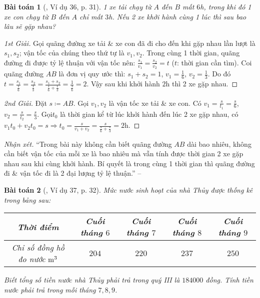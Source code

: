 \documentclass{article}
\newtheorem{baitoan}{Bài toán}
\begin{document}
\begin{baitoan}[\cite{Tuyen_Toan_7}, Ví dụ 36, p. 31]
	1 xe tải chạy từ $A$ đến $B$ mất $6$\emph{h}, trong khi đó 1 xe con chạy từ $B$ đến $A$ chỉ mất $3$\emph{h}. Nếu 2 xe khởi hành cùng 1 lúc thì sau bao lâu sẽ gặp nhau?
\end{baitoan}

\begin{proof}[1st Giải]
	Gọi quãng đường xe tải \& xe con đã đi cho đến khi gặp nhau lần lượt là $s_1,s_2$; vận tốc của chúng theo thứ tự là $v_1,v_2$. Trong cùng 1 thời gian, quãng đường đi được tỷ lệ thuận với vận tốc nên: $\frac{s_1}{v_1} = \frac{s_2}{v_2} = t$ ($t$: thời gian cần tìm). Coi quãng đường $AB$ là đơn vị quy ước thì: $s_1 + s_2 = 1$, $v_1 = \frac{1}{6}$, $v_2 = \frac{1}{3}$. Do đó $t = \frac{s_1}{\frac{1}{6}} = \frac{s_2}{\frac{1}{3}} = \frac{s_1 + s_2}{\frac{1}{6} + \frac{1}{3}} = \frac{1}{\frac{3}{6}} = 2$. Vậy sau khi khởi hành $2$h thì 2 xe gặp nhau.
\end{proof}

\begin{proof}[2nd Giải]
	Đặt $s\coloneqq AB$. Gọi $v_1,v_2$ là vận tốc xe tải \& xe con. Có $v_1 = \frac{s}{t_1} = \frac{s}{6}$, $v_2 = \frac{s}{t_2} = \frac{s}{3}$. Gọi$t_0$ là thời gian kể từ lúc khởi hành đến lúc 2 xe gặp nhau, có $v_1t_0 + v_2t_0 = s\Rightarrow t_0 = \frac{s}{v_1 + v_2} = \frac{s}{\frac{s}{6} + \frac{s}{3}} = 2$h.
\end{proof}
\noindent\textit{Nhận xét.} ``Trong bài này không cần biết quãng đường $AB$ dài bao nhiêu, không cần biết vận tốc của mỗi xe là bao nhiêu mà vẫn tính được thời gian 2 xe gặp nhau sau khi cùng khởi hành. Bí quyết là trong cùng 1 thời gian thì quãng đường đi \& vận tốc đi là 2 đại lượng tỷ lệ thuận.'' -- \cite[p. 31]{Tuyen_Toan_7}

\begin{baitoan}[\cite{Tuyen_Toan_7}, Ví dụ 37, p. 32]
	Mức nước sinh hoạt của nhà Thủy được thống kê trong bảng sau:
	
	\begin{table}[H]
		\centering
		\begin{tabular}{|c|c|c|c|c|}
			\hline
			Thời điểm & Cuối tháng $6$ & Cuối tháng $7$ & Cuối tháng $8$ & Cuối tháng $9$ \\
			\hline
			Chỉ số đồng hồ đo nước $\rm m^3$ & $204$ & $220$ & $237$ & $250$ \\
			\hline
		\end{tabular}
	\end{table}
	Biết tổng số tiền nước nhà Thủy phải trả trong quý III là $184000$ đồng. Tính tiền nước phải trả trong mỗi tháng $7,8,9$.
\end{baitoan}
\end{document}
